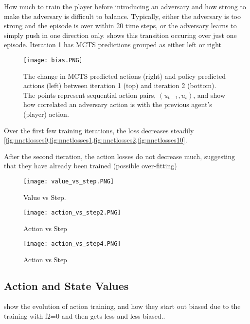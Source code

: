 \documentclass[../main.tex]{subfiles}
\begin{document}
How much to train the player before introducing an adversary and how strong to make the adversary is difficult to balance. Typically, either the adversary is too strong and the episode is over within 20 time steps, or the adversary learns to simply push in one direction only.  shows this transition occuring over just one episode. Iteration 1 has MCTS predictions grouped as either left or right

\begin{figure}[h]
    \centering
    \texttt{[image: bias.PNG]}
    \caption{The change in MCTS predicted actions (right) and policy predicted actions (left) between iteration 1 (top) and iteration 2 (bottom). The points represent sequential action pairs, $(u_{t-1}, u_t)$, and show how correlated an adversary action is with the previous agent's (player) action.}
    \label{fig:actioncorr}
\end{figure}

Over the first few training iterations, the loss decreases steadily \cref{fig:nnetlosses0,fig:nnetlosses1,fig:nnetlosses2,fig:nnetlosses10}.

After the second iteration, the action losses do not decrease much, suggesting that they have already been trained (possible over-fitting)

\begin{figure}[h]
    \centering
    \texttt{[image: value\_vs\_step.PNG]}
    \caption{Value vs Step.}
    \label{fig:value}
\end{figure}

\begin{figure}[h]
    \centering
    \texttt{[image: action\_vs\_step2.PNG]}
    \caption{Action vs Step}
    \label{fig:action2}
\end{figure}

\begin{figure}[h]
    \centering
    \texttt{[image: action\_vs\_step4.PNG]}
    \caption{Action vs Step}
    \label{fig:action4}
\end{figure}

\subsection{Action and State Values}



show the evolution of action training, and how they start out biased due to the training with f2=0 and then gets less and less biased..
\end{document}

